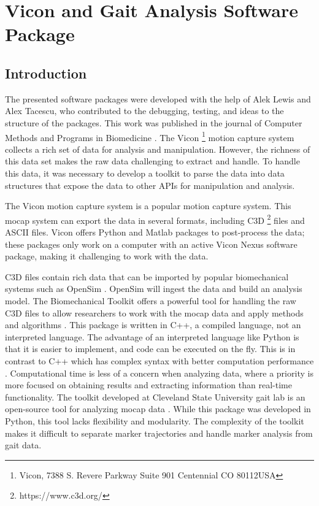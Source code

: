 \chapter{Vicon and Gait Analysis Software Package}
\label{chap:software}
\section{Introduction}

The presented software packages were developed with the help of Alek Lewis and Alex Tacescu, who contributed to the debugging, testing, and ideas to the structure of the packages. This work was published in the journal of Computer Methods and Programs in Biomedicine \cite{goldfarb2021open}. The Vicon \footnote{Vicon, 7388 S. Revere Parkway Suite 901 Centennial CO 80112USA} motion capture system collects a rich set of data for analysis and manipulation. However, the richness of this data set makes the raw data challenging to extract and handle. To handle this data, it was necessary to develop a toolkit to parse the data into data structures that expose the data to other APIs for manipulation and analysis. 

The Vicon motion capture system is a popular motion capture system. This mocap system can export the data in several formats, including C3D \footnote{https://www.c3d.org/}  files and ASCII files. Vicon offers Python and Matlab packages to post-process the data; these packages only work on a computer with an active Vicon Nexus software package, making it challenging to work with the data. 

C3D files contain rich data that can be imported by popular biomechanical systems such as OpenSim \cite{seth2018opensim}. OpenSim will ingest the data and build an analysis model. The Biomechanical Toolkit offers a powerful tool for handling the raw C3D files to allow researchers to work with the mocap data and apply methods and algorithms \cite{barre2014biomechanical}. This package is written in C++, a compiled language, not an interpreted language. The advantage of an interpreted language like Python is that it is easier to implement, and code can be executed on the fly. This is in contrast to C++ which has complex syntax with better computation performance \cite{varisteas2018distributed} \cite{bargiacchi2020ai}. Computational time is less of a concern when analyzing data, where a priority is more focused on obtaining results and extracting information than real-time functionality. The toolkit developed at Cleveland State University gait lab is an open-source tool for analyzing mocap data  \cite{DTK2014} \cite{GATK2014}. While this package was developed in Python, this tool lacks flexibility and modularity. The complexity of the toolkit makes it difficult to separate marker trajectories and handle marker analysis from gait data.   

